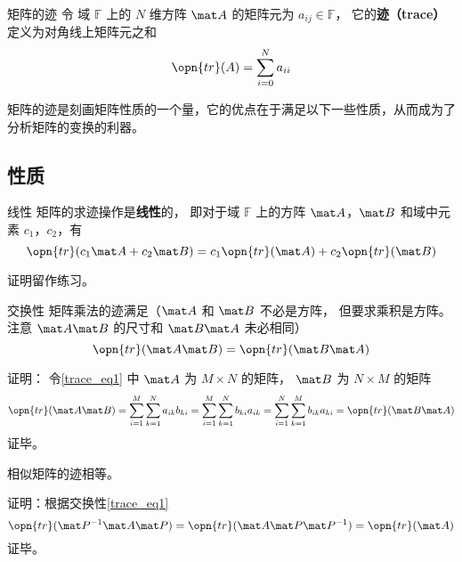


\begin{definition}{矩阵的迹}
令 域 $\mathbb{F}$ 上的 $N$ 维方阵 $\mat A$ 的矩阵元为 $a_{ij}\in\mathbb{F}$， 它的\textbf{迹（trace）}定义为对角线上矩阵元之和
\begin{equation}
\opn{tr}(A) = \sum_{i=0}^N a_{ii}
\end{equation}
\end{definition}

矩阵的迹是刻画矩阵性质的一个量，它的优点在于满足以下一些性质，从而成为了分析矩阵的变换的利器。


\subsection{性质}
\begin{theorem}{线性}
矩阵的求迹操作是\textbf{线性}的， 即对于域 $\mathbb{F}$ 上的方阵 $\mat A$，$\mat B$ 和域中元素 $c_1$，$c_2$，有
\begin{equation}
\opn{tr}(c_1\mat A+c_2\mat B) = c_1\opn{tr}(\mat A) + c_2\opn{tr}(\mat B)
\end{equation}
\end{theorem}
证明留作练习。

\begin{theorem}{交换性}\label{trace_the1}
矩阵乘法的迹满足（$\mat A$ 和 $\mat B$ 不必是方阵， 但要求乘积是方阵。 注意 $\mat A\mat B$ 的尺寸和 $\mat B\mat A$ 未必相同）
\begin{equation}\label{trace_eq1}
\opn{tr}(\mat A\mat B) = \opn{tr}(\mat B\mat A)
\end{equation}
\end{theorem}
证明： 令\autoref{trace_eq1} 中 $\mat A$ 为 $M\times N$ 的矩阵， $\mat B$ 为 $N\times M$ 的矩阵
\begin{equation}
\opn{tr}(\mat A\mat B) = \sum_{i=1}^M \sum_{k=1}^N a_{ik}b_{ki} = \sum_{i=1}^M \sum_{k=1}^N b_{ki}a_{ik} = \sum_{i=1}^N \sum_{k=1}^M b_{ik}a_{ki} = \opn{tr}(\mat B\mat A)
\end{equation}
证毕。

\begin{theorem}{}
相似矩阵的迹相等。
\end{theorem}
证明：根据交换性\autoref{trace_eq1} 
$$\opn{tr}(\mat P^{-1}\mat A\mat P) = \opn{tr}(\mat A\mat P\mat P^{-1}) = \opn{tr}(\mat A)$$
证毕。

